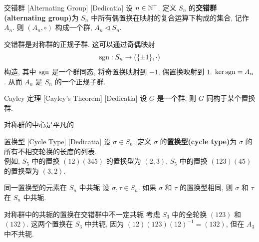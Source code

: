         \begin{dfn}
            [AlternatingGroup]
            {交错群}
            [Alternating Group]
            [Dedicatia]
            设 \(n\in\operatorname{\mathbb{N}}^+\). 定义 \(S_n\) 的\textbf{交错群(alternating group)}为 \(S_n\) 中所有偶置换在映射的复合运算下构成的集合, 记作 \(A_n\). 则 \((A_n,\circ)\) 构成一个群, \(A_n\lhd S_n\).
        \end{dfn}

        \begin{rmk}
            [Dedicatia]
            交错群是对称群的正规子群. 这可以通过奇偶映射
            \[\operatorname{sgn} : S_n \to (\{\pm 1\}, \cdot)\]
            构造, 其中 \(\operatorname{sgn}\) 是一个群同态, 将奇置换映射到 \(-1\), 偶置换映射到 \(1\). \(\ker \operatorname{sgn} = A_n\). 从而 \(A_n\) 是 \(S_n\) 的一个正规子群.
        \end{rmk}

        \begin{thm}
            [Cayley]
            {Cayley 定理}
            [Cayley's Theorem]
            [Dedicatia]
            设 \(G\) 是一个群, 则 \(G\) 同构于某个置换群.
        \end{thm}

        \begin{ppt}
            {对称群的中心是平凡的}
        \end{ppt}

        \begin{dfn}
            {置换型}
            [Cycle Type]
            [Dedicatia]
            设 \(\sigma\in S_n\). 定义 \(\sigma\) 的\textbf{置换型(cycle type)}为 \(\sigma\) 的所有不相交轮换的长度的列表. \\
            例如, \(S_5\) 中的置换 \((12)(345)\) 的置换型为 \((2,3)\), \(S_5\) 中的置换 \((123)(45)\) 的置换型为 \((3,2)\).
        \end{dfn}

        \begin{ppt}
            {同一置换型的元素在 \(S_n\) 中共轭}
            设 \(\sigma, \tau\in S_n\). 如果 \(\sigma\) 和 \(\tau\) 的置换型相同, 则 \(\sigma\) 和 \(\tau\) 在 \(S_n\) 中共轭.
        \end{ppt}

        \begin{cxmp}
            {对称群中的共轭的置换在交错群中不一定共轭}
            考虑 \(S_3\) 中的全轮换 \((123)\) 和 \((132)\). 这两个置换在 \(S_3\) 中共轭, 因为 \((12)(123)(12)^{-1}=(132)\), 但在 \(A_3\) 中不共轭.
        \end{cxmp}


